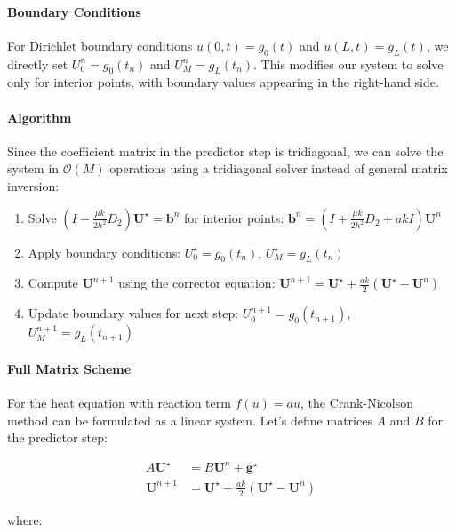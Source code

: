 \paragraph{Boundary Conditions}
For Dirichlet boundary conditions $u(0,t) = g_0(t)$ and $u(L,t) = g_L(t)$, we directly set $U_0^n = g_0(t_n)$ and $U_M^n = g_L(t_n)$. This modifies our system to solve only for interior points, with boundary values appearing in the right-hand side.

\paragraph{Algorithm}
Since the coefficient matrix in the predictor step is tridiagonal, we can solve the system in $\mathcal{O}(M)$ operations using a tridiagonal solver instead of general matrix inversion:
\begin{enumerate}
  \item Solve $(I - \frac{\mu k}{2h^2}D_2) \mathbf{U}^{\star} = \mathbf{b}^n$ for interior points: $\mathbf{b}^n = (I + \frac{\mu k}{2h^2}D_2 + akI) \mathbf{U}^n$
  \item Apply boundary conditions: $U_0^{\star} = g_0(t_n)$, $U_M^{\star} = g_L(t_n)$
  \item Compute $\mathbf{U}^{n+1}$ using the corrector equation: $\mathbf{U}^{n+1} = \mathbf{U}^{\star} + \frac{ak}{2}(\mathbf{U}^{\star} - \mathbf{U}^n)$
  \item Update boundary values for next step: $U_0^{n+1} = g_0(t_{n+1})$, $U_M^{n+1} = g_L(t_{n+1})$
\end{enumerate}
\paragraph{Full Matrix Scheme}
For the heat equation with reaction term $f(u) = au$, the Crank-Nicolson method can be formulated as a linear system. Let's define matrices $A$ and $B$ for the predictor step:

\begin{align}
  A \mathbf{U}^\star & = B \mathbf{U}^n + \mathbf{g}^\star                                \\
  \mathbf{U}^{n+1}   & = \mathbf{U}^\star + \frac{ak}{2}(\mathbf{U}^\star - \mathbf{U}^n)
\end{align}

where:

